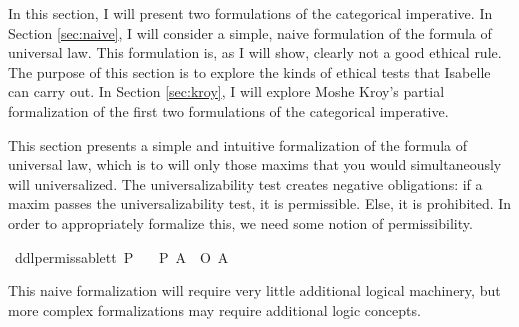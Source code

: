 %
\begin{isabellebody}%
%
%
\isadelimtheory
%
\endisadelimtheory
%
\isatagtheory
%
\endisatagtheory
{\isafoldtheory}%
%
\isadelimtheory
%
\endisadelimtheory
%
\isadelimdocument
%
\endisadelimdocument
%
\isatagdocument
%
\isamarkuptrue%
%
\endisatagdocument
{\isafolddocument}%
%
\isadelimdocument
%
\endisadelimdocument
%
\begin{isamarkuptext}%
In this section, I will present two formulations of the categorical imperative. In Section \ref{sec:naive}, I will 
consider a simple, naive formulation of the formula of universal law. This formulation is, as I will 
show, clearly not a good ethical rule. The purpose of this section is to explore the kinds of ethical
tests that Isabelle can carry out. In Section \ref{sec:kroy}, I will explore Moshe Kroy's \cite{kroy} partial formalization of 
the first two formulations of the categorical imperative.%
\end{isamarkuptext}\isamarkuptrue%
%
\isadelimdocument
%
\endisadelimdocument
%
\isatagdocument
%
\isamarkuptrue%
%
\endisatagdocument
{\isafolddocument}%
%
\isadelimdocument
%
\endisadelimdocument
%
\begin{isamarkuptext}%
This section presents a simple and intuitive formalization of the formula of universal law, which 
is to will only those maxims that you would simultaneously will universalized. The universalizability 
test creates negative obligations: if a maxim passes the universalizability test, it is permissible. Else,
it is prohibited. In order to appropriately formalize this, we need some notion of permissibility.%
\end{isamarkuptext}\isamarkuptrue%
\isamarkupfalse%
\ ddlpermissable{\isacharcolon}{\isacharcolon}{\isachardoublequoteopen}t{\isasymRightarrow}t{\isachardoublequoteclose}\ {\isacharparenleft}{\isachardoublequoteopen}P{\isacharunderscore}{\isachardoublequoteclose}{\isacharparenright}\isanewline
\ \ \ {\isachardoublequoteopen}{\isacharparenleft}P\ A{\isacharparenright}\ {\isasymequiv}\ {\isacharparenleft}\isactrlbold {\isasymnot}{\isacharparenleft}O\ {\isacharbraceleft}\isactrlbold {\isasymnot}A{\isacharbraceright}{\isacharparenright}{\isacharparenright}{\isachardoublequoteclose}\isanewline
%
%
\begin{isamarkuptext}%
This naive formalization will require very little additional logical machinery, but more complex
formalizations may require additional logic concepts. 


\end{isamarkuptext}
\end{isabellebody}
